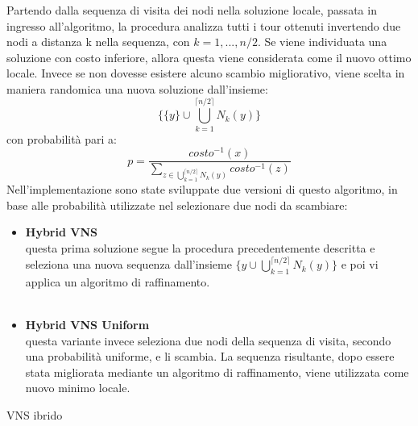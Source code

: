 Partendo dalla sequenza di visita dei nodi nella soluzione locale, passata in ingresso all'algoritmo, la procedura analizza tutti i tour ottenuti invertendo due nodi a distanza k nella sequenza, con $k=1,...,n/2$. Se viene individuata una soluzione con costo inferiore, allora questa viene considerata come il nuovo ottimo locale. Invece se non dovesse esistere alcuno scambio migliorativo, viene scelta in maniera randomica una nuova soluzione dall'insieme:
$$\biggl\{\{y\}\cup \bigcup_{k=1}^{\lceil n/2 \rceil}{N_k(y)}\biggr\}$$
con probabilità pari a:
$$p=\frac{costo^{-1}(x)}{\underset{z \in {\bigcup_{k=1}^{\lceil n/2 \rceil}{N_k(y)}}}\sum{costo^{-1}(z)}}$$
Nell'implementazione sono state sviluppate due versioni di questo algoritmo, in base alle probabilità utilizzate nel selezionare due nodi da scambiare: 
\begin{itemize}
\item{\textbf{Hybrid VNS}\\
questa prima soluzione segue la procedura precedentemente descritta e seleziona una nuova sequenza dall'insieme $\{{y}\cup \bigcup_{k=1}^{\lceil n/2 \rceil}{N_k(y)}\}$ e poi vi applica un algoritmo di raffinamento.\\\\} 
\item{\textbf{Hybrid VNS Uniform}\\
questa variante invece seleziona due nodi della sequenza di visita, secondo una probabilità uniforme, e li scambia. La sequenza risultante, dopo essere stata migliorata mediante un algoritmo di raffinamento, viene utilizzata come nuovo minimo locale.}
\end{itemize}
\begin{algorithm}[h]
\DontPrintSemicolon
{}
\BlankLine
{}
 \caption{VNS ibrido}\label{VNS}
\end{algorithm}

